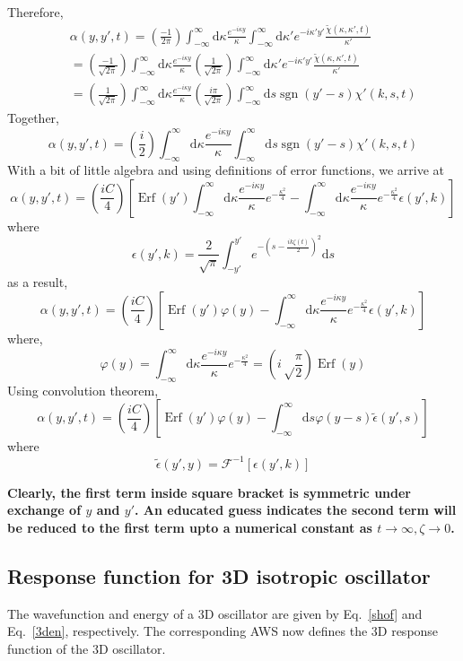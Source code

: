 \documentclass[jcp,groupaddress]{revtex4-1}
\DeclareMathOperator{\sign}{sgn}
\newcommand{\eq}{\begin{equation}}
\newcommand{\qe}{\end{equation}}
\DeclareMathOperator{\erf}{Erf}
\newcommand{\lp}{\left(}
\newcommand{\rp}{\right)}
\newcommand{\diff}{\mathrm{d}}
\begin{document}
Therefore, 
\begin{eqnarray}
&&\alpha(y, y', t) = \lp \frac{-1}{2\pi}\rp \int_{-\infty}^{\infty} \diff \kappa \frac{e^{-i \kappa y}}{\kappa}\int_{-\infty}^{\infty} \diff \kappa' e^{-i \kappa' y'} \frac{\tilde{\chi}(\kappa, \kappa', t)}{\kappa'}\\
     && =\lp \frac{-1}{\sqrt{2\pi}}\rp \int_{-\infty}^{\infty} \diff \kappa \frac{e^{-i \kappa y}}{\kappa}\lp \frac{1}{\sqrt{2\pi}}\rp\int_{-\infty}^{\infty} \diff \kappa' e^{-i \kappa' y'} \frac{\tilde{\chi}(\kappa, \kappa', t)}{\kappa'}\\
 &&= \lp \frac{1}{\sqrt{2\pi}}\rp \int_{-\infty}^{\infty} \diff \kappa \frac{e^{-i \kappa y}}{\kappa} \lp \frac{i \pi}{\sqrt{2\pi}}\rp \int_{-\infty}^{\infty} \diff s \sign(y'-s) \chi'(k, s, t)
\end{eqnarray}
Together, 
\eq
\alpha(y, y', t) = \lp \frac{i}{2}\rp \int_{-\infty}^{\infty} \diff \kappa \frac{e^{-i \kappa y}}{\kappa}  \int_{-\infty}^{\infty} \diff s \sign(y'-s) \chi'(k, s, t)
\qe
With a bit of little algebra and using definitions of error functions, we arrive at 
\eq
\alpha(y, y', t) = \lp \frac{iC}{4}\rp \left[ \erf(y') \int_{-\infty}^{\infty} \diff \kappa \frac{e^{-i \kappa y}}{\kappa} e^{-\frac{\kappa^2}{4}}  - \int_{-\infty}^{\infty} \diff \kappa \frac{e^{-i \kappa y}}{\kappa} e^{-\frac{\kappa^2}{4}} \epsilon \lp y',k \rp \right]
\qe
where 
\eq
\epsilon \lp y', k\rp = \frac{2}{\sqrt{\pi}} \int_{-y'}^{y'} e^{-(s-\frac{ik\zeta(t)}{2})^{2}} \diff s 
\qe
as a result,
\eq
\alpha(y, y', t) = \lp \frac{iC}{4}\rp \left[ \erf(y') \varphi(y) - \int_{-\infty}^{\infty} \diff \kappa \frac{e^{-i \kappa y}}{\kappa} e^{-\frac{\kappa^2}{4}} \epsilon \lp y',k \rp \right]
\qe
where,
\eq
\varphi(y) = \int_{-\infty}^{\infty} \diff \kappa \frac{e^{-i \kappa y}}{\kappa} e^{-\frac{\kappa^2}{4}}=\lp {i\sqrt \frac{\pi}{2}} \rp \erf(y)
\qe
Using convolution theorem, 
\eq
\alpha(y, y', t) = \lp \frac{iC}{4}\rp \left[ \erf(y') \varphi(y) - \int_{-\infty}^{\infty} \diff s \varphi(y-s) \tilde{\epsilon} (y',s) \right]
\qe
where 
\eq
\tilde{\epsilon}(y', y) =\mathcal{F}^{-1}[\epsilon(y', k)]
\qe

\textbf{Clearly, the first term inside square bracket is symmetric under exchange of $y$ and $y'$. An educated guess indicates the second term will be reduced to the first term upto a numerical constant as $t \to \infty, \zeta \to 0$. }

\subsection{Response function for 3D isotropic oscillator}
 The wavefunction and energy of a 3D oscillator are given by Eq.~\eqref{shof} and Eq.~\eqref{3den}, respectively. The corresponding AWS now defines the 3D response function of the 3D oscillator. \\
\end{document}
